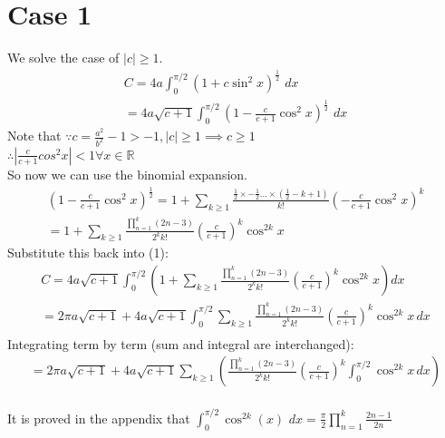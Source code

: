 \documentclass{article}
\begin{document}
\section{Case 1}
We solve the case of $|c| \geq 1$.
\begin{equation}
\begin{split}
	C = 4a\int_{0}^{\pi/2}(1 + c\sin^2x)^\frac{1}{2}\,\,dx\\
	= 4a\sqrt{c+1}\int_{0}^{\pi/2}(1 - \frac{c}{c+1}\cos^2x)^\frac{1}{2}\,\,dx
\end{split}
\end{equation}
Note that $\because c=\frac{a^2}{b^2} - 1 > -1, |c|\geq 1 \implies c\geq 1$\\
$\therefore |\frac{c}{c+1}cos^2x|<1\forall x \in \mathbb{R}$\\
So now we can use the binomial expansion.
\begin{equation*}
\begin{split}
	\left(1 - \frac{c}{c+1}\cos^2x\right)^\frac{1}{2}
	= 1 + \sum_{k\geq 1} \frac{\frac{1}{2}\times-\frac{1}{2}\dots\times(\frac{1}{2}-k+1)}{k!}\left(-\frac{c}{c+1}\cos^2x\right)^k\\
	= 1 + \sum_{k\geq 1} \frac{\prod_{n=1}^{k}(2n-3)}{2^kk!}\left(\frac{c}{c+1}\right)^k\cos^{2k}x
\end{split}
\end{equation*}
Substitute this back into (1):
\begin{equation*}
\begin{split}
	C = 4a\sqrt{c+1}\int_{0}^{\pi/2}\left(
	1 + \sum_{k\geq 1} \frac{\prod_{n=1}^{k}(2n-3)}{2^kk!}\left(\frac{c}{c+1}\right)^k\cos^{2k}x
	\right)dx\\
	= 2\pi a\sqrt{c+1} + 4a\sqrt{c+1}\int_{0}^{\pi/2}\sum_{k\geq 1} \frac{\prod_{n=1}^{k}(2n-3)}{2^kk!}\left(\frac{c}{c+1}\right)^k\cos^{2k}x\,dx\\
\end{split}
\end{equation*}
Integrating term by term (sum and integral are interchanged):
\begin{equation}
\begin{split}
	= 2\pi a\sqrt{c+1} +
	4a\sqrt{c+1}\sum_{k\geq 1}\left( \frac{\prod_{n=1}^{k}(2n-3)}{2^kk!}\left(\frac{c}{c+1}\right)^k\int_{0}^{\pi/2}\cos^{2k}x\,dx\right)\\
\end{split}
\end{equation}

It is proved in the appendix that $\int_{0}^{\pi/2}\cos^{2k}(x)\,\,dx = \frac{\pi}{2}\prod_{n=1}^{k}\frac{2n-1}{2n}$
\end{document}
